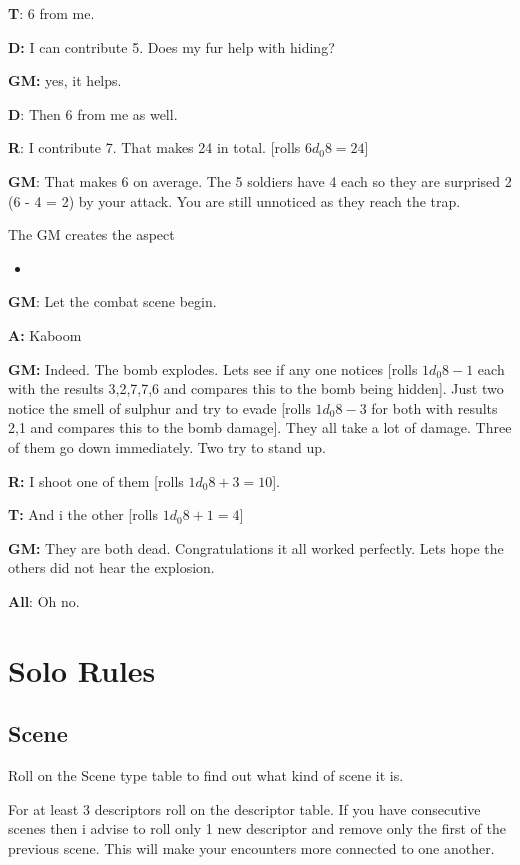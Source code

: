 \documentclass[11pt]{article}
\begin{document}
{\textbf{T}: 6 from me.

\textbf{D:} I can contribute 5. Does my fur help with hiding?

\textbf{GM:} yes, it helps.

\textbf{D}: Then 6 from me as well.

\textbf{R}: I contribute 7. That makes 24 in total. [rolls \(6 d_0 8 = 24\)]

\textbf{GM}: That makes 6 on average. The 5 soldiers have 4 each so they are surprised 2 (6 - 4 = 2) by your attack. You are still unnoticed as they reach the trap.

The GM creates the aspect
\begin{itemize}
\item {}
\end{itemize}

\textbf{GM}: Let the combat scene begin.

\textbf{A:} Kaboom

\textbf{GM:} Indeed. The bomb explodes. Lets see if any one notices [rolls \(1 d_0 8 - 1\) each with the results 3,2,7,7,6 and compares this to the bomb being hidden]. Just two notice the smell of sulphur and try to evade [rolls \(1 d_0 8 - 3\) for both with results 2,1 and compares this to the bomb damage]. They all take a lot of damage. Three of them go down immediately. Two try to stand up.

\textbf{R:} I shoot one of them [rolls \(1 d_0 8 + 3 = 10\)].

\textbf{T:} And i the other [rolls \(1 d_0 8 + 1 = 4\)]

\textbf{GM:} They are both dead. Congratulations it all worked perfectly. Lets hope the others did not hear the explosion.

\textbf{All}: Oh no.


\newpage

\section{Solo Rules}
\label{sec:orgf0fc246}

\subsection{Scene}
\label{sec:org6b3c505}
Roll on the Scene type table to find out what kind of scene it is.

For at least 3 descriptors roll on the descriptor table. If you have consecutive scenes then i advise to roll only 1 new descriptor and remove only the first of the previous scene. This will make your encounters more connected to one another.

}
\end{document}
